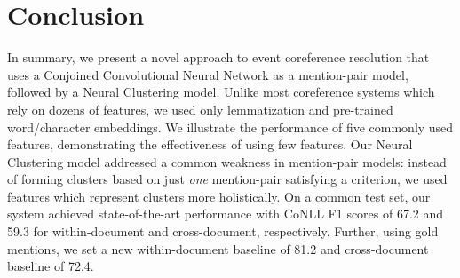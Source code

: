 \documentclass[11pt,a4paper]{article}
\begin{document}
\section{Conclusion}
In summary, we present a novel approach to event coreference resolution that uses a Conjoined Convolutional Neural Network as a mention-pair model, followed by a Neural Clustering model.  Unlike most coreference systems which rely on dozens of features, we used only lemmatization and pre-trained word/character embeddings.  We illustrate the performance of five commonly used features, demonstrating the effectiveness of using few features.  Our Neural Clustering model addressed a common weakness in mention-pair models: instead of forming clusters based on just \textit{one} mention-pair satisfying a criterion, we used features which represent clusters more holistically.  On a common test set, our system achieved state-of-the-art performance with CoNLL F1 scores of 67.2 and 59.3 for within-document and cross-document, respectively.  Further, using gold mentions, we set a new within-document baseline of 81.2 and cross-document baseline of 72.4.

%
%



\appendix
\end{document}
